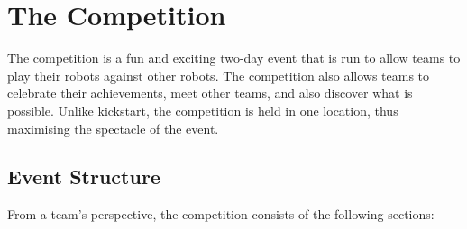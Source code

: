 \section{The Competition}

The competition is a fun and exciting two-day event that is run to allow teams to play their robots against other robots.  The competition also allows teams to celebrate their achievements, meet other teams, and also discover what is possible.  Unlike kickstart, the competition is held in one location, thus maximising the spectacle of the event.

\subsection{Event Structure}

From a team's perspective, the competition consists of the following sections:

